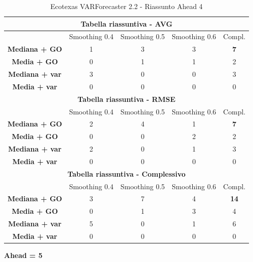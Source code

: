 \documentclass[12pt,a4paper,oneside,openright]{book}
\begin{document}
\begin{table}[H]
\centering
\begin{tabular}{|c|c|c|c|c|}
\hline
\multicolumn{5}{|c|}{\textbf{Tabella riassuntiva - AVG}} \\
\hline
& Smoothing 0.4 & Smoothing 0.5 & Smoothing 0.6 & Compl.\\
\hline
\textbf{Mediana + GO} & 1 & 3 & 3 & \textbf{7}\\ 
\hline
\textbf{Media + GO} & 0 & 1 & 1 & 2\\ 
\hline
\textbf{Mediana + var} & 3 & 0 & 0 & 3\\ 
\hline
\textbf{Media + var} & 0 & 0 & 0 & 0\\ 
\hline
\multicolumn{5}{|c|}{\textbf{Tabella riassuntiva - RMSE}} \\
\hline
& Smoothing 0.4 & Smoothing 0.5 & Smoothing 0.6 & Compl.\\
\hline
\textbf{Mediana + GO} & 2 & 4 & 1 & \textbf{7}\\ 
\hline
\textbf{Media + GO} & 0 & 0 & 2 & 2\\ 
\hline
\textbf{Mediana + var} & 2 & 0 & 1 & 3\\ 
\hline
\textbf{Media + var} & 0 & 0 & 0 & 0\\ 
\hline
\multicolumn{5}{|c|}{\textbf{Tabella riassuntiva - Complessivo}} \\
\hline
& Smoothing 0.4 & Smoothing 0.5 & Smoothing 0.6 & Compl.\\
\hline
\textbf{Mediana + GO} & 3 & 7 & 4 & \textbf{14}\\ 
\hline
\textbf{Media + GO} & 0 & 1 & 3 & 4\\ 
\hline
\textbf{Mediana + var} & 5 & 0 & 1 & 6\\ 
\hline
\textbf{Media + var} & 0 & 0 & 0 & 0\\ 
\hline
\end{tabular} 
\caption{Ecotexas VARForecaster 2.2 - Riassunto Ahead 4}
\end{table}

\newpage

\textbf{Ahead = 5}

\medskip
\end{document}
